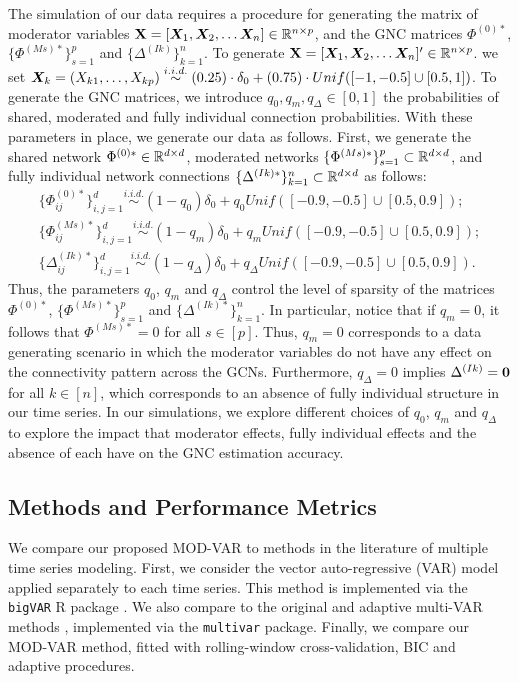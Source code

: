 The simulation of our data requires a procedure for generating the matrix of moderator variables $\mathbf{X} = [\bm{X}_1, \bm{X}_2,\ldots \bm{X}_{n}]\in\mathbb{R}^{n \times p}$, and the GNC matrices $\Phi^{(0)*}$, $\{\Phi^{(Ms)*}\}_{s=1}^p$ and $\{\Delta^{(Ik)}\}_{k=1}^n$. To generate $\mathbf{X}= [\bm{X}_1, \bm{X}_2,\ldots \bm{X}_{n}]'\in\mathbb{R}^{n\times p}$. we set $\bm{X}_{k} = (X_{k1},\ldots ,X_{kp}) \stackrel{i.i.d.}{\sim} (0.25)\cdot\delta_0 + (0.75) \cdot Unif([-1,-0.5]\cup [0.5, 1])$. To generate the GNC matrices, we introduce $q_{0}, q_{m}, q_{\Delta}\in[0,1]$ the probabilities of shared, moderated and fully individual connection probabilities. With these parameters in place, we generate our data as follows. First, we generate the shared network  $\Phi^{(0)*}\in\mathbb{R}^{d\times d}$, moderated networks  $\{\Phi^{(Ms)*}\}_{s=1}^p \subset\mathbb{R}^{d\times d}$, and fully individual network connections $\{\Delta^{(Ik)*}\}_{k=1}^n \subset \mathbb{R}^{d\times d}$ as follows:
\begin{align*}
	\{\Phi^{(0)*}_{ij}\}_{i,j=1}^d \stackrel{i.i.d.}{\sim} (1-q_{0}) \delta_0 + q_{0} Unif([-0.9,-0.5]\cup [0.5,0.9]);\\
	\{\Phi^{(Ms)*}_{ij}\}_{i,j=1}^d \stackrel{i.i.d.}{\sim} (1-q_{m}) \delta_0 + q_{m} Unif([-0.9,-0.5]\cup [0.5,0.9]);\\
	\{\Delta^{(Ik)*}_{ij}\}_{i,j=1}^d \stackrel{i.i.d.}{\sim} (1-q_{\Delta}) \delta_0 + q_{\Delta} Unif([-0.9,-0.5]\cup [0.5,0.9]).
\end{align*}
Thus, the parameters $q_0$, $q_m$ and $q_\Delta$ control the level of sparsity of the matrices $\Phi^{(0)*}$, $\{\Phi^{(Ms)*}\}_{s=1}^p$ and $\{\Delta^{(Ik)*}\}_{k=1}^n$. In particular, notice that if $q_{m} = 0$, it follows that $\Phi^{(Ms)*} = 0$ for all $s\in[p]$. Thus, $q_{m} = 0$ corresponds to a data generating scenario in which the moderator variables do not have any effect on the connectivity pattern across the GCNs. Furthermore, $q_{\Delta} = 0$ implies $\Delta^{(Ik)} = {\mathbf{0}}$ for all $k\in[n]$, which corresponds to an absence of fully individual structure in our time series. In our simulations, we explore different choices of $q_{0}$, $q_m$ and $q_\Delta$ to explore the impact that moderator effects, fully individual effects and the absence of each have on the GNC estimation accuracy.

\subsection{Methods and Performance Metrics}

We compare our proposed MOD-VAR to methods in the literature of multiple time series modeling. First, we consider the vector auto-regressive (VAR) model \citep{basu2015regularized} applied separately to each time series. This method is implemented via the \texttt{bigVAR} R package \citep{nicholson2023bigVAR}. We also compare to the original and adaptive multi-VAR methods \citep{fisher2022penalized}, implemented via the \texttt{multivar} package. Finally, we compare our MOD-VAR method, fitted with rolling-window cross-validation, BIC and adaptive procedures. 

